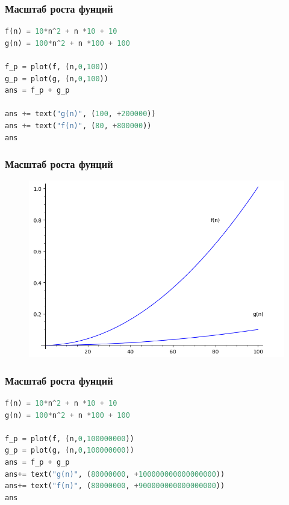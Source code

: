 \documentclass[russian, 12pt]{beamer}
\begin{document}
\begin{frame}[fragile]
\frametitle{Масштаб роста фунций}
\begin{lstlisting}[language=Python]
f(n) = 10*n^2 + n *10 + 10
g(n) = 100*n^2 + n *100 + 100

f_p = plot(f, (n,0,100))
g_p = plot(g, (n,0,100))
ans = f_p + g_p 

ans += text("g(n)", (100, +200000))
ans += text("f(n)", (80, +800000))
ans
\end{lstlisting}
\end{frame}
\begin{frame}[fragile]
\frametitle{Масштаб роста фунций}
\begin{figure}
\includegraphics[width=\linewidth]{img/complexity_2.png}
\end{figure}
\end{frame}
\begin{frame}[fragile]
\frametitle{Масштаб роста фунций}
\begin{lstlisting}[language=Python]
f(n) = 10*n^2 + n *10 + 10
g(n) = 100*n^2 + n *100 + 100

f_p = plot(f, (n,0,100000000))
g_p = plot(g, (n,0,100000000))
ans = f_p + g_p 
ans+= text("g(n)", (80000000, +100000000000000000))
ans+= text("f(n)", (80000000, +900000000000000000))
ans
\end{lstlisting}
\end{frame}
\end{document}
